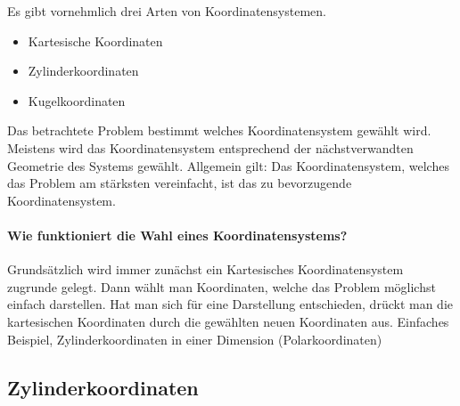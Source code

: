 \begin{importantbox}
Es gibt vornehmlich drei Arten von Koordinatensystemen. 
\begin{itemize}
	\item Kartesische Koordinaten
	\item Zylinderkoordinaten
	\item Kugelkoordinaten
\end{itemize}
Das betrachtete Problem bestimmt welches Koordinatensystem gewählt wird. Meistens wird das Koordinatensystem entsprechend der nächstverwandten Geometrie des Systems gewählt. Allgemein gilt: Das Koordinatensystem, welches das Problem am stärksten vereinfacht, ist das zu bevorzugende Koordinatensystem.

\paragraph{Wie funktioniert die Wahl eines Koordinatensystems?}
Grundsätzlich wird immer zunächst ein Kartesisches Koordinatensystem zugrunde gelegt. Dann wählt man Koordinaten, welche das Problem möglichst einfach darstellen. Hat man sich für eine Darstellung entschieden, drückt man die kartesischen Koordinaten durch die gewählten neuen Koordinaten aus.
Einfaches Beispiel, Zylinderkoordinaten in einer Dimension (Polarkoordinaten)


\end{importantbox}


\subsection{Zylinderkoordinaten}

